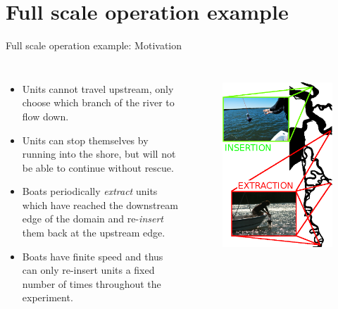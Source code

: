 \documentclass[xcolor=pdflatex,dvipsnames,table]{beamer}
\begin{document}
\section{Full scale operation example}
\begin{frame}{Full scale operation example: Motivation}
\begin{columns}
\begin{itemize}
 \small
 \item Units cannot travel upstream, only choose which branch of the river to flow down. 
 \item Units can stop themselves by running into the shore, but will not be able to continue without rescue. 
 \item Boats periodically \emph{extract} units which have reached the downstream edge of the domain and re-\emph{insert} them back at the upstream edge.
 \item Boats have finite speed and thus can only re-insert units a fixed number of times throughout the experiment.
\end{itemize}


 \begin{figure}
     {\includegraphics[height=.8\textheight]{figures/full_scale.png}}
  \end{figure}
\end{columns}
\end{frame}
\end{document}
